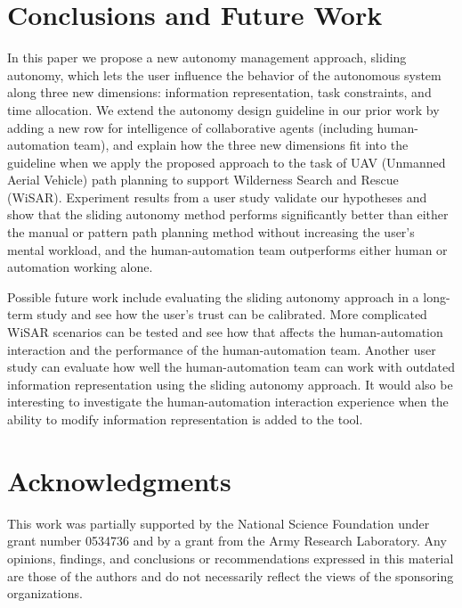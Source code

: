 \documentclass[journal]{IEEEtran}
\begin{document}
\section{Conclusions and Future Work} 
\label{sec:Conclusions6}

In this paper we propose a new autonomy management approach, sliding autonomy, which lets the user influence the behavior of the autonomous system along three new dimensions: information representation, task constraints, and time allocation. We extend the autonomy design guideline in our prior work by adding a new row for intelligence of collaborative agents (including human-automation team), and explain how the three new dimensions fit into the guideline when we apply the proposed approach to the task of UAV (Unmanned Aerial Vehicle) path planning to support Wilderness Search and Rescue (WiSAR). Experiment results from a user study validate our hypotheses and show that the sliding autonomy method performs significantly better than either the manual or pattern path planning method without increasing the user's mental workload, and the human-automation team outperforms either human or automation working alone.

Possible future work include evaluating the sliding autonomy approach in a long-term study and see how the user's trust can be calibrated. More complicated WiSAR scenarios can be tested and see how that affects the human-automation interaction and the performance of the human-automation team. Another user study can evaluate how well the human-automation team can work with outdated information representation using the sliding autonomy approach. It would also be interesting to investigate the human-automation interaction experience when the ability to modify information representation is added to the tool.

\section*{Acknowledgments}

This work was partially supported by 
the National Science Foundation 
under grant number 
0534736 
and by a grant from
the Army Research Laboratory.
Any opinions, findings, and conclusions or recommendations expressed in this material are those of the authors and do not necessarily reflect the views of the sponsoring organizations.
\end{document}
